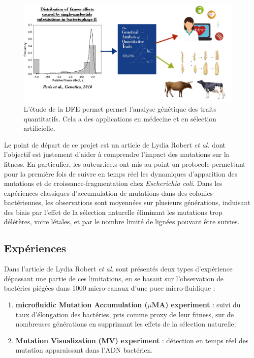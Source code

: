 \documentclass[12pt]{article}
\begin{document}
\begin{figure}[h]
 \begin{center}
	\vspace{3mm}
	\includegraphics[scale=0.25]{../Img/DFE_phage_2010.jpg}
\end{center} 
  \caption{L'étude de la DFE permet permet l'analyse génétique des traits quantitatifs. Cela a des applications en médecine et en sélection artificielle.}
\end{figure}

Le point de départ de ce projet est un article de Lydia Robert \textit{et al.} \cite{rob} dont l'objectif est justement d'aider à comprendre l’impact des mutations sur la fitness. En particulier, les auteur.ice.s ont mis au point un protocole permettant pour la première fois de suivre en temps réel les dynamiques d’apparition des mutations et de croissance-fragmentation chez \textit{Escherichia coli}. Dans les expériences classiques d’accumulation de mutations dans des colonies bactériennes, les observations sont moyennées sur plusieurs générations, induisant des biais par l’effet de la sélection naturelle éliminant les mutations trop délétères, voire létales, et par le nombre limité de lignées pouvant être suivies. 

\subsection{Expériences}

Dans l'article de Lydia Robert \textit{et al.} \cite{rob} sont présentés deux types d'expérience dépassant une partie de ces limitations, en se basant sur l'observation de bactéries piégées dans 1000 micro-canaux d'une puce micro-fluidique :
\begin{enumerate}
\item \textbf{microfluidic Mutation Accumulation ($\mu$MA) experiment} : suivi du taux d'élongation des bactéries, pris comme proxy de leur fitness, sur de nombreuses générations en supprimant les effets de la sélection naturelle;
\item \textbf{Mutation Visualization (MV) experiment} : détection en temps réel des mutation apparaissant dans l'ADN bactérien.
\end{enumerate}
\end{document}
